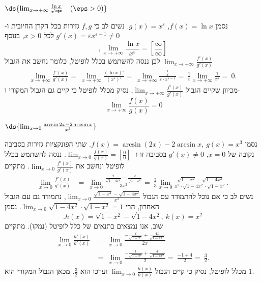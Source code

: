 \item $\ds{\lim_{x \to +\infty} \frac{\ln x}{x^\eps} \quad (\eps > 0)}$
\begin{solbox}
נסמן
$f(x)=\ln x$,
$g(x)=x^\varepsilon$.
נשים לב כי
$f,g$
גזירות בכל הקרן החיובית ו-
$g'(x)=\varepsilon x^{\varepsilon-1}\neq 0$
לכל
$x>0$,
בנוסף
$$,\lim_{x \to +\infty} \frac{\ln x}{x^\varepsilon}=\left[\frac{\infty}{\infty}\right]$$
לכן ננסה להשתמש בכלל לופיטל,
כלומר נחשב את הגבול
$\displaystyle\lim_{x \to +\infty} \frac{f'(x)}{g'(x)}$
\begin{align*}
    \displaystyle\lim_{x \to +\infty} \frac{f'(x)}{g'(x)}=\ \lim_{x \to +\infty} \frac{(\ln x)'}{(x^\varepsilon)'}
    =\ \lim_{x \to +\infty}\frac{\frac{1}{x}}{\varepsilon \cdot x^{\varepsilon - 1}}
=\ \frac{1}{\varepsilon} \lim_{x \to +\infty} \frac{1}{x^\varepsilon}
=\ 0.
\end{align*}
מכיוון שקיים הגבול
$\displaystyle\lim_{x \to +\infty} \frac{f'(x)}{g'(x)}$,
נסיק מכלל לופיטל כי קיים גם הגבול המקורי ו-
$$.\displaystyle\lim_{x \to +\infty} \frac{f(x)}{g(x)}=0$$
\end{solbox}
\item $\ds{\lim_{x \to 0} \frac{\arcsin 2x - 2\arcsin x}{x^3}}$
\begin{solbox}
נסמן
$.f(x)=\arcsin(2x)-2\arcsin x,\ g(x)=x^3$
שתי הפונקציות גזירות בסביבה נקובה של
$x=0$,
$g'(x)\neq0$
בסביבה זו ו-
$\displaystyle\lim_{x\to0}\frac{f(x)}{g(x)}=\left[\frac{0}{0}\right]$.
ננסה להשתמש בכלל לופיטל ונחשב את
$\displaystyle\lim_{x\to0}\frac{f'(x)}{g'(x)}$.
מתקיים
\begin{align*}
    \lim_{x \to 0} \frac{f'(x)}{g'(x)}&=\ \lim_{x \to 0} \frac{\frac{2}{\sqrt{1 - 4x^2}} - \frac{2}{\sqrt{1 - x^2}}}{3x^2}
=\ \frac{2}{3} \lim_{x \to 0} \frac{\sqrt{1 - x^2} - \sqrt{1 - 4x^2}}{x^2 \cdot \sqrt{1 - 4x^2} \cdot \sqrt{1 - x^2}}.
\end{align*}
נשים לב כי אם נוכל להתמודד עם הגבול
$\displaystyle\lim_{x\to0}\frac{\sqrt{1 - x^2} - \sqrt{1 - 4x^2}}{x^2}$,
נתמודד גם עם הגבול האחרון, הרי
$\displaystyle\lim_{x\to0}\sqrt{1 - 4x^2} \cdot \sqrt{1 - x^2}=1$.
נסמן
$$.h(x)=\sqrt{1 - x^2} - \sqrt{1 - 4x^2},\ k(x)=x^2$$
שוב, אנו נמצאים בתנאים של כלל לופיטל
(נמקו).
מתקיים
\begin{align*}
    \lim_{x\to0}\frac{h'(x)}{k'(x)}&=\ \lim_{x\to 0}\frac{-\frac{x}{\sqrt{1-x^2}}+\frac{4x}{\sqrt{1-4x^2}}}{2x}\\
    &=\ \lim_{x\to 0}\frac{-\frac{1}{\sqrt{1-x^2}}+\frac{4}{\sqrt{1-4x^2}}}{2}
    =\ \frac{-1+4}{2}
    =\ \frac{3}{2}.
\end{align*}
מכלל לופיטל, נסיק כי קיים הגבול
$\displaystyle\lim_{x\to0}\frac{h(x)}{k(x)}$
וערכו הוא
$\frac{3}{2}$.
מכאן הגבול המקורי הוא
$1$.
\end{solbox}
